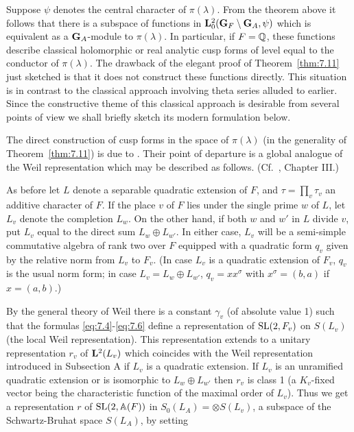 Suppose $\psi$ denotes the central character of $\pi(\lambda)$. From the theorem above it follows that there is a subspace of functions in $\mathbf{L}_0^2(\mathbf{G}_F \setminus \mathbf{G}_A, \psi)$ which is equivalent as a $\mathbf{G}_A$-module to $\pi(\lambda)$. In particular, if $F = \mathbb{Q}$, these functions describe classical holomorphic or real analytic cusp forms of level equal to the conductor of $\pi(\lambda)$. The drawback of the elegant proof of Theorem~\ref{thm:7.11} just sketched is that it does not construct these functions directly. This situation is in contrast to the classical approach involving theta series alluded to earlier. Since the constructive theme of this classical approach is desirable from several points of view we shall briefly sketch its modern formulation below.

The direct construction of cusp forms in the space of $\pi(\lambda)$ (in the generality of Theorem~\ref{thm:7.11}) is due to \cite{ShalikaTanaka}. Their point of departure is a global analogue of the Weil representation which may be described as follows. (Cf.\ \cite{Weil3}, Chapter III.)

As before let $L$ denote a separable quadratic extension of $F$, and $\tau = \prod_v \tau_v$ an additive character of $F$. If the place $v$ of $F$ lies under the single prime $w$ of $L$, let $L_v$ denote the completion $L_w$. On the other hand, if both $w$ and $w'$ in $L$ divide $v$, put $L_v$ equal to the direct sum $L_w \oplus L_{w'}$. In either case, $L_v$ will be a semi-simple commutative algebra of rank two over $F$ equipped with a quadratic form $q_v$ given by the relative norm from $L_v$ to $F_v$. (In case $L_v$ is a quadratic extension of $F_v$, $q_v$ is the usual norm form; in case $L_v = L_w \oplus L_{w'}$, $q_v = xx^{\sigma}$ with $x^{\sigma} = (b, a)$ if $x = (a, b)$.)

By the general theory of Weil there is a constant $\gamma_v$ (of absolute value 1) such that the formulas \eqref{eq:7.4}-\eqref{eq:7.6} define a representation of $\operatorname{SL}(2,F_v)$ on $S(L_v)$ (the local Weil representation). This representation extends to a unitary representation $r_v$ of $\mathbf{L}^2(L_v)$ which coincides with the Weil representation introduced in Subsection A if $L_v$ is a quadratic extension. If $L_v$ is an unramified quadratic extension or is isomorphic to $L_w \oplus L_{w'}$ then $r_v$ is class 1 (a $K_v$-fixed vector being the characteristic function of the maximal order of $L_v$). Thus we get a representation $r$ of $\operatorname{SL}(2,\mathbb{A}(F))$ in $S_0(L_A) = \otimes S(L_v)$, a subspace of the Schwartz-Bruhat space $S(L_A)$, by setting

